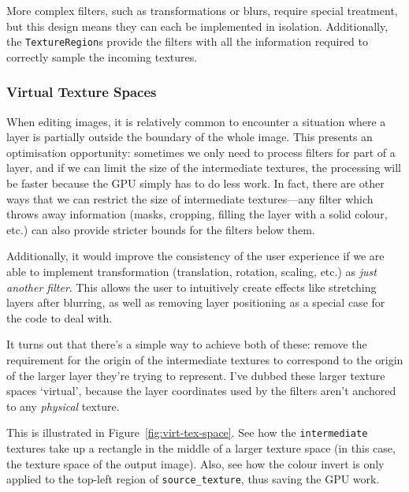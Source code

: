 \documentclass[12pt]{article}
\begin{document}
More complex filters, such as transformations or blurs, require special treatment, but this design
means they can each be implemented in isolation.  Additionally, the \verb|TextureRegion|s provide
the filters with all the information required to correctly sample the incoming textures.

\subsubsection{Virtual Texture Spaces}\label{sec:virt-tex-spaces}

When editing images, it is relatively common to encounter a situation where a layer is partially
outside the boundary of the whole image.  This presents an optimisation opportunity: sometimes we
only need to process filters for part of a layer, and if we can limit the size of the intermediate
textures, the processing will be faster because the GPU simply has to do less work.  In fact, there
are other ways that we can restrict the size of intermediate textures---any filter which throws away
information (masks, cropping, filling the layer with a solid colour, etc.) can also provide stricter
bounds for the filters below them.

Additionally, it would improve the consistency of the user experience if we are able to implement
transformation (translation, rotation, scaling, etc.) as \emph{just another filter}.  This allows
the user to intuitively create effects like stretching layers after blurring, as well as removing
layer positioning as a special case for the code to deal with.

It turns out that there's a simple way to achieve both of these: remove the requirement for the
origin of the intermediate textures to correspond to the origin of the larger layer they're trying
to represent.  I've dubbed these larger texture spaces `virtual', because the layer coordinates used
by the filters aren't anchored to any \emph{physical} texture.

This is illustrated in Figure~\ref{fig:virt-tex-space}.  See how the \verb|intermediate| textures
take up a rectangle in the middle of a larger texture space (in this case, the texture space of the
output image).  Also, see how the colour invert is only applied to the top-left region of
\verb|source_texture|, thus saving the GPU work.
\end{document}
